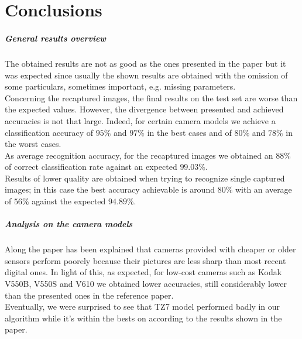 \chapter{Conclusions}
\paragraph{General results overview}
The obtained results are not as good as the ones presented in the paper \cite{result} but it was expected since usually the shown results are obtained with the omission of some particulars, sometimes important, e.g. missing parameters.\\
Concerning the recaptured images, the final results on the test set are worse than the expected values. However, the divergence between presented and achieved accuracies is not that large. Indeed, for certain camera models we achieve a classification accuracy of $95\%$ and $97\%$ in the best cases and of $80\%$ and $78\%$ in the worst cases.\\
As average recognition accuracy, for the recaptured images we obtained an $88\%$ of correct classification rate against an expected $99.03\%$.\\
Results of lower quality are obtained when trying to recognize single captured images; in this case the best accuracy achievable is around $80\%$ with an average of $56\%$ against the expected $94.89\%$.\\

\paragraph{Analysis on the camera models}
Along the paper has been explained that cameras provided with cheaper or older sensors perform poorely because their pictures are less sharp than most recent digital ones. In light of this, as expected, for low-cost cameras such as Kodak V550B, V550S and V610
we obtained lower accuracies, still considerably lower than the presented ones in the reference paper.\\
Eventually, we were surprised to see that TZ7 model performed badly in our algorithm while it's within the bests on according to the results shown in the paper.

